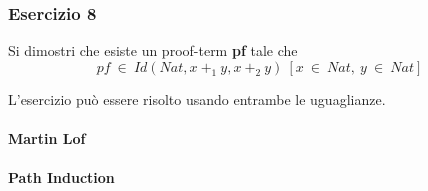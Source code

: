 \setcounter{subsubsection}{7}
\subsubsection{Esercizio 8}
\begin{thm}
	Si dimostri che esiste un proof-term \textbf{pf} tale che
	\[pf~\in~Id(Nat, x~+_1~y, x~+_2~y)~[x~\in~Nat,~y~\in~Nat]\]
\end{thm}
L'esercizio può essere risolto usando entrambe le uguaglianze.
\paragraph{Martin Lof}

\paragraph{Path Induction}
